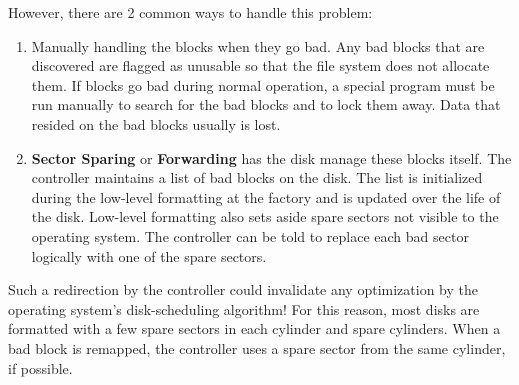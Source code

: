 However, there are 2 common ways to handle this problem:
\begin{enumerate}[noitemsep]
\item Manually handling the blocks when they go bad.
  Any bad blocks that are discovered are flagged as unusable so that the file system does not allocate them.
  If blocks go bad during normal operation, a special program must be run manually to search for the bad blocks and to lock them away.
  Data that resided on the bad blocks usually is lost.

\item \textbf{Sector Sparing} or \textbf{Forwarding} has the disk manage these blocks itself.
  The controller maintains a list of bad blocks on the disk.
  The list is initialized during the low-level formatting at the factory and is updated over the life of the disk.
  Low-level formatting also sets aside spare sectors not visible to the operating system.
  The controller can be told to replace each bad sector logically with one of the spare sectors.
\end{enumerate}

Such a redirection by the controller could invalidate any optimization by the operating system’s disk-scheduling algorithm!
For this reason, most disks are formatted with a few spare sectors in each cylinder and spare cylinders.
When a bad block is remapped, the controller uses a spare sector from the same cylinder, if possible.



